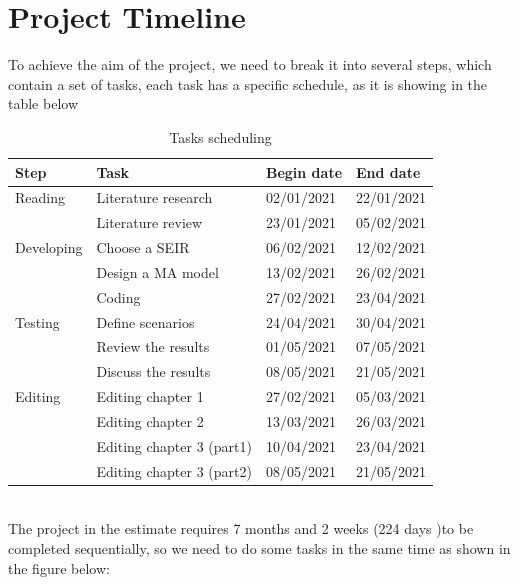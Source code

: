 \documentclass[paper=a4, fontsize=11.5pt]{scrartcl}
\numberwithin{equation}{section}		%
\numberwithin{figure}{section}			%
\numberwithin{table}{section}				%
\begin{document}
\section{Project Timeline}
\quad To achieve the aim of the project, we need to break it into several steps, which contain a set of tasks, each task has a specific schedule, as it is showing in the table below
\begin{table}[h]
\centering
\begin{tabular}{l|l|l|l}  
	\hline
	Step & Task & Begin date & End date \\
	\hline
	Reading& Literature research & 02/01/2021 & 22/01/2021\\
	                                                 & Literature review & 23/01/2021 & 05/02/2021\\
	\hline
	Developing& Choose a SEIR & 06/02/2021 & 12/02/2021\\
	                           & Design a MA model& 13/02/2021 & 26/02/2021\\
	                           & Coding & 27/02/2021 & 23/04/2021\\
	\hline
          Testing & Define scenarios & 24/04/2021 & 30/04/2021\\
					  & Review the results & 01/05/2021 & 07/05/2021\\
	                                             & Discuss the results & 08/05/2021 & 21/05/2021\\
	\hline
	Editing & Editing chapter 1 & 27/02/2021 & 05/03/2021 \\
				         & Editing chapter 2 & 13/03/2021 & 26/03/2021\\
	                                         & Editing chapter 3 (part1) & 10/04/2021 & 23/04/2021\\
				         & Editing chapter 3 (part2) & 08/05/2021 & 21/05/2021\\
	\hline
	
\end{tabular}
\caption{Tasks scheduling }
\label{tab:Table3}
\end{table}
\\
The project in the estimate requires 7 months and 2 weeks (224 days )to be completed sequentially, so we need to do some tasks in the same time as shown in the figure below:
\end{document}
